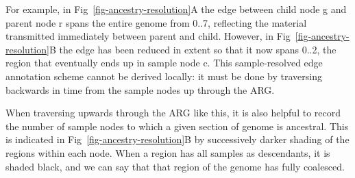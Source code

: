 \documentclass{article}
\begin{document}
For example, in Fig~\ref{fig-ancestry-resolution}A the edge between child node \textsf{g} and
parent node \textsf{r} spans the entire genome from 0..7, reflecting the material
transmitted immediately between parent and child.
However, in Fig~\ref{fig-ancestry-resolution}B the edge has been reduced in extent so that
it now spans 0..2, the region that eventually ends up in
sample node \textsf{c}. This sample-resolved edge annotation scheme cannot be
derived locally: it must be done by traversing backwards in time from the sample nodes
up through the ARG.


%


When traversing upwards through the ARG like this, it is also helpful to record
the number of sample nodes to which a given section of genome is ancestral.
This is indicated in Fig~\ref{fig-ancestry-resolution}B by successively darker shading
of the regions within each node. When a region has all samples as descendants, it is
shaded black, and we can say that that region of the genome has fully coalesced.
\end{document}
